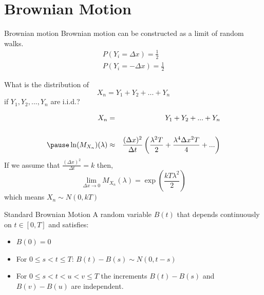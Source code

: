 \section{Brownian Motion}

\begin{frame}{Brownian motion}
Brownian motion can be constructed as a limit of random walks.
\begin{eqnarray*}
 P(Y_i=\Delta x)=\frac{1}{2} \\
 P(Y_i=-\Delta x)=\frac{1}{2}
\end{eqnarray*}
\pause

\begin{center}
What is the distribution of 
\begin{equation*}
X_n=Y_1+Y_2+...+Y_n
\end{equation*}
if $Y_1,Y_2,...,Y_n$ are i.i.d.? 
\end{center}
\end{frame}


\begin{frame}
\begin{eqnarray*}
X_n&= &Y_1+Y_2+...+Y_n\\ \\
\pause
\ln (M_{X_n})(\lambda)&\approx &\frac{(\Delta x)^2}{\Delta t} \left(\frac{\lambda ^2 T}{2}+\frac{\lambda ^4 \Delta x ^2 T}{4}+... \right)\\
\end{eqnarray*}
\pause
If we assume that $\frac{(\Delta x)^2}{\Delta t}=k$ then,
\begin{equation*}
\lim_{\Delta x \to 0}{M_{X_n}(\lambda)}=\exp\left(\frac{kT\lambda ^2}{2}\right)
\end{equation*}
which means $X_n \sim N(0,kT)$
\end{frame}

\begin{frame}
\begin{block}{Standard Brownian Motion}
A random variable $B(t)$ that depends continuously on $t \in [0,T]$ and satisfies: 
\begin{itemize}
\item $B(0)=0$
\item For $0 \leq s<t\leq T$: $B(t)-B(s)\sim N(0, t-s)$
\item For $0 \leq s<t<u<v\leq T$ the increments $B(t)-B(s)$ and $B(v)-B(u)$ are independent.
\end{itemize}
\end{block}
\end{frame}

